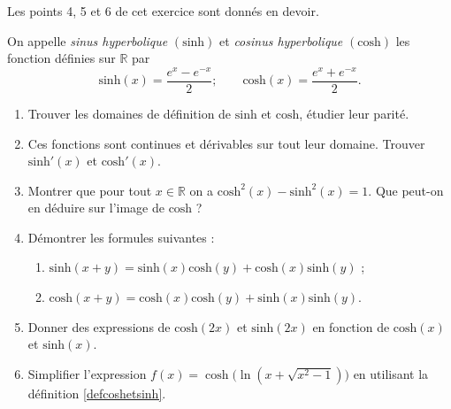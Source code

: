 
\begin{exercice}\label{exostarterST-0015}

  \begin{remark}
    Les points 4, 5 et 6 de cet exercice sont donnés en devoir.
  \end{remark}

On appelle \emph{sinus hyperbolique} $(\text{sinh})$ et \emph{cosinus hyperbolique} $(\text{cosh})$ les fonction définies sur $\mathbb{R}$ par 
\begin{equation}\label{defcoshetsinh}
  \text{sinh}(x) = \frac{e^x-e^{-x}}{2} ; \qquad  \text{cosh}(x) = \frac{e^x+e^{-x}}{2}. 
\end{equation}
\begin{enumerate}
\item Trouver les domaines de définition de  $\text{sinh}$ et  $\text{cosh}$, étudier leur parité. 
\item Ces fonctions sont continues et dérivables sur tout leur domaine. Trouver $\text{sinh}'(x)$ et  $\text{cosh}'(x)$.
\item Montrer que pour tout $x\in\mathbb{R}$ on a  $\text{cosh}^2 (x) - \text{sinh}^2 (x) = 1$. Que peut-on en déduire sur l'image de $\text{cosh}$ ?
\item Démontrer les formules suivantes :
\begin{enumerate}
\item $\text{sinh} (x+y)=\text{sinh}(x) \text{cosh}(y)+\text{cosh}(x)\text{sinh}(y)$ ;
\item $\text{cosh} (x+y)=\text{cosh}(x) \text{cosh}(y)+\text{sinh}(x)\text{sinh}(y)$.
\end{enumerate}
\item Donner des expressions de $\text{cosh}(2x)$ et $\text{sinh}(2x)$  en fonction de $\text{cosh}(x)$ et $\text{sinh}(x)$.
\item Simplifier l'expression $f(x)=\cosh\Big(\ln(x+\sqrt{x^2-1})\Big)$ en utilisant la définition \eqref{defcoshetsinh}.
\end{enumerate}


\end{exercice}
